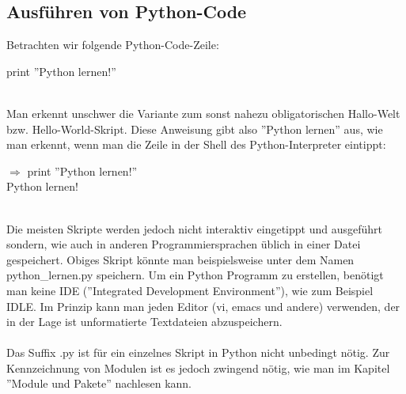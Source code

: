 \subsection{Ausführen von Python-Code}
Betrachten wir folgende Python-Code-Zeile:\\
\begin{MyConsoleBox}{
print ''Python lernen!''
}\end{MyConsoleBox}
\\
Man erkennt unschwer die Variante zum sonst nahezu obligatorischen Hallo-Welt bzw. Hello-World-Skript. Diese Anweisung gibt also ''Python lernen'' aus, wie man erkennt, wenn man die Zeile in der Shell des Python-Interpreter eintippt:\\
\begin{MyConsoleBox}{
${\Longrightarrow}$ print ''Python lernen!'' \\
Python lernen!
}\end{MyConsoleBox}
\\
Die meisten Skripte werden jedoch nicht interaktiv eingetippt und ausgeführt sondern, wie auch in anderen Programmiersprachen üblich in einer Datei gespeichert. Obiges Skript könnte man beispielsweise unter dem Namen python\_lernen.py speichern. Um ein Python Programm zu erstellen, benötigt man keine IDE (''Integrated Development Environment''), wie zum Beispiel IDLE. Im Prinzip kann man jeden Editor (vi, emacs und andere) verwenden, der in der Lage ist unformatierte Textdateien abzuspeichern.\\
\\
Das Suffix .py ist für ein einzelnes Skript in Python nicht unbedingt nötig. Zur Kennzeichnung von Modulen ist es jedoch zwingend nötig, wie man im Kapitel ''Module und Pakete'' nachlesen kann.

